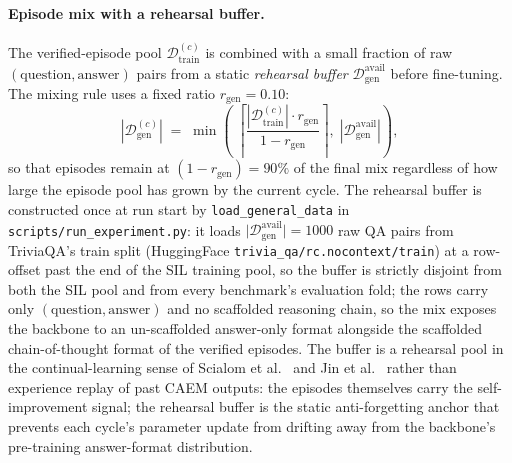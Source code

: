 \paragraph{Episode mix with a rehearsal buffer.}
The verified-episode pool $\mathcal{D}_{\text{train}}^{(c)}$ is combined with a small fraction of raw $(\text{question}, \text{answer})$ pairs from a static \emph{rehearsal buffer} $\mathcal{D}_{\text{gen}}^{\text{avail}}$ before fine-tuning. The mixing rule uses a fixed ratio $r_{\text{gen}} = 0.10$:
\begin{equation}
|\mathcal{D}_{\text{gen}}^{(c)}| \;=\; \min\!\left(\; \left\lceil \frac{|\mathcal{D}_{\text{train}}^{(c)}| \cdot r_{\text{gen}}}{1 - r_{\text{gen}}} \right\rceil,\; |\mathcal{D}_{\text{gen}}^{\text{avail}}| \right),
\label{eq:mix-size}
\end{equation}
so that episodes remain at $(1 - r_{\text{gen}}) = 90\%$ of the final mix regardless of how large the episode pool has grown by the current cycle. The rehearsal buffer is constructed once at run start by \texttt{load\_general\_data} in \texttt{scripts/run\_experiment.py}: it loads $\lvert \mathcal{D}_{\text{gen}}^{\text{avail}}\rvert = 1000$ raw QA pairs from TriviaQA's train split (HuggingFace \texttt{trivia\_qa/rc.nocontext/train}) at a row-offset past the end of the SIL training pool, so the buffer is strictly disjoint from both the SIL pool and from every benchmark's evaluation fold; the rows carry only $(\text{question}, \text{answer})$ and no scaffolded reasoning chain, so the mix exposes the backbone to an un-scaffolded answer-only format alongside the scaffolded chain-of-thought format of the verified episodes. The buffer is a rehearsal pool in the continual-learning sense of Scialom et al.~\cite{scialom2022fine} and Jin et al.~\cite{jin2024forget} rather than experience replay of past CAEM outputs: the episodes themselves carry the self-improvement signal; the rehearsal buffer is the static anti-forgetting anchor that prevents each cycle's parameter update from drifting away from the backbone's pre-training answer-format distribution.

